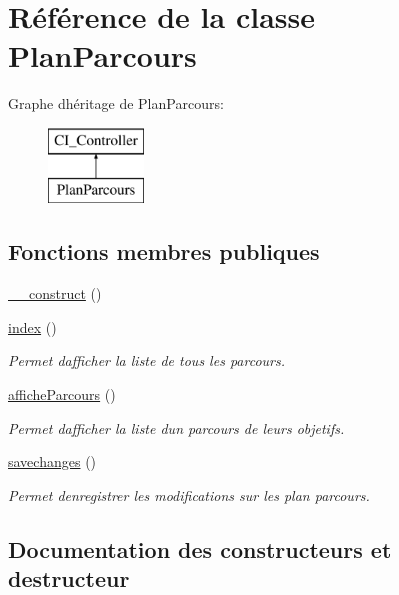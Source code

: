 \hypertarget{class_plan_parcours}{}\section{Référence de la classe Plan\+Parcours}
\label{class_plan_parcours}
Graphe d\textquotesingle{}héritage de Plan\+Parcours\+:\begin{figure}[H]
\begin{center}
\leavevmode
\includegraphics[height=2.000000cm]{class_plan_parcours}
\end{center}
\end{figure}
\subsection*{Fonctions membres publiques}
\begin{DoxyCompactItemize}
\item 
\hyperlink{class_plan_parcours_a95302a139b5663a75b9db40b78439dc4}{\+\_\+\+\_\+construct} ()
\item 
\hyperlink{class_plan_parcours_a8c0cd2eecf9fa1bc5b260052d63a686f}{index} ()
\begin{DoxyCompactList}\small\item\em Permet d\textquotesingle{}afficher la liste de tous les parcours. \end{DoxyCompactList}\item 
\hyperlink{class_plan_parcours_aceb6c03fe7a721229c7f3fef3f2423a1}{affiche\+Parcours} ()
\begin{DoxyCompactList}\small\item\em Permet d\textquotesingle{}afficher la liste d\textquotesingle{}un parcours de leurs objetifs. \end{DoxyCompactList}\item 
\hyperlink{class_plan_parcours_a59c363ad9d644b0f1ebefab3e08bab5a}{savechanges} ()
\begin{DoxyCompactList}\small\item\em Permet d\textquotesingle{}enregistrer les modifications sur les plan parcours. \end{DoxyCompactList}\end{DoxyCompactItemize}


\subsection{Documentation des constructeurs et destructeur}
\mbox{\label{class_plan_parcours_a95302a139b5663a75b9db40b78439dc4}} 
